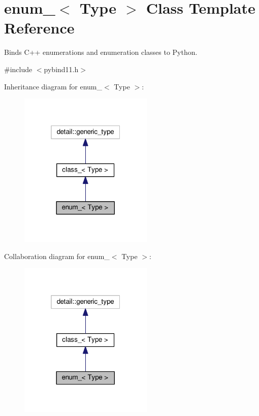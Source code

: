 \hypertarget{classenum__}{}\section{enum\+\_\+$<$ Type $>$ Class Template Reference}
\label{classenum__}


Binds C++ enumerations and enumeration classes to Python.  




{\ttfamily \#include $<$pybind11.\+h$>$}



Inheritance diagram for enum\+\_\+$<$ Type $>$\+:
\nopagebreak
\begin{figure}[H]
\begin{center}
\leavevmode
\includegraphics[width=181pt]{classenum____inherit__graph}
\end{center}
\end{figure}


Collaboration diagram for enum\+\_\+$<$ Type $>$\+:
\nopagebreak
\begin{figure}[H]
\begin{center}
\leavevmode
\includegraphics[width=181pt]{classenum____coll__graph}
\end{center}
\end{figure}
